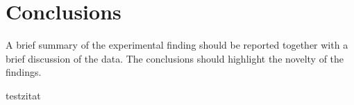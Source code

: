 \chapter{Conclusions}

A brief summary of the experimental finding should be reported together with a brief discussion
of the data. The conclusions should highlight the novelty of the findings.

testzitat \cite{fauster}